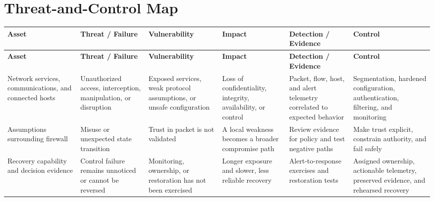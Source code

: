 \documentclass[11pt]{article}
\begin{document}
\section*{Threat-and-Control Map}
\begingroup\scriptsize\setlength{\tabcolsep}{2pt}
\begin{longtable}{>{\RaggedRight\arraybackslash}p{}>{\RaggedRight\arraybackslash}p{}>{\RaggedRight\arraybackslash}p{}>{\RaggedRight\arraybackslash}p{}>{\RaggedRight\arraybackslash}p{}>{\RaggedRight\arraybackslash}p{}}
\toprule\rowcolor{Navy}\color{white}\textbf{Asset} & \color{white}\textbf{Threat / Failure} & \color{white}\textbf{Vulnerability} & \color{white}\textbf{Impact} & \color{white}\textbf{Detection / Evidence} & \color{white}\textbf{Control}\\\midrule
\endfirsthead
\toprule\rowcolor{Navy}\color{white}\textbf{Asset} & \color{white}\textbf{Threat / Failure} & \color{white}\textbf{Vulnerability} & \color{white}\textbf{Impact} & \color{white}\textbf{Detection / Evidence} & \color{white}\textbf{Control}\\\midrule
\endhead
Network services, communications, and connected hosts & Unauthorized access, interception, manipulation, or disruption & Exposed services, weak protocol assumptions, or unsafe configuration & Loss of confidentiality, integrity, availability, or control & Packet, flow, host, and alert telemetry correlated to expected behavior & Segmentation, hardened configuration, authentication, filtering, and monitoring\\\midrule
Assumptions surrounding firewall & Misuse or unexpected state transition & Trust in packet is not validated & A local weakness becomes a broader compromise path & Review evidence for policy and test negative paths & Make trust explicit, constrain authority, and fail safely\\\midrule
Recovery capability and decision evidence & Control failure remains unnoticed or cannot be reversed & Monitoring, ownership, or restoration has not been exercised & Longer exposure and slower, less reliable recovery & Alert-to-response exercises and restoration tests & Assigned ownership, actionable telemetry, preserved evidence, and rehearsed recovery\\\midrule
\bottomrule
\end{longtable}
\endgroup
\end{document}
